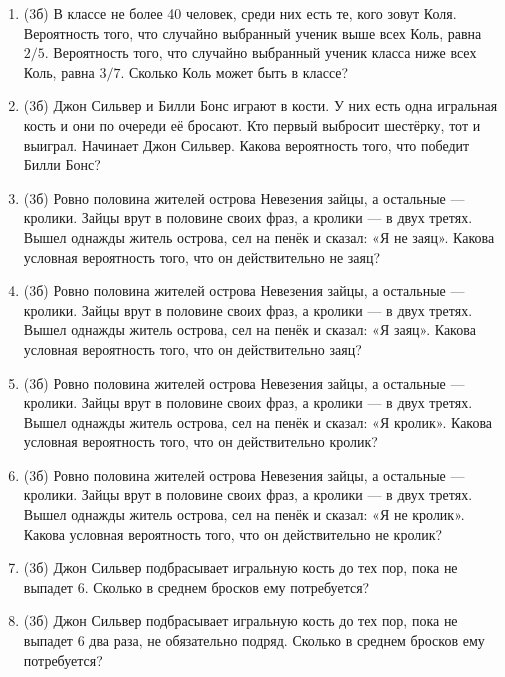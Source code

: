 \documentclass[a4paper, 12pt]{article}
\begin{document}
\newpage
\begin{enumerate}
\item (3б) В классе не более 40 человек, среди них есть те, кого зовут Коля. Вероятность того, что случайно выбранный ученик выше всех Коль, равна $2/5$. Вероятность того, что случайно выбранный ученик класса ниже всех Коль, равна $3/7$. Сколько Коль может быть в классе?
\item (3б) Джон Сильвер и Билли Бонс играют в кости. У них есть одна игральная кость и они по очереди её бросают. Кто первый выбросит шестёрку, тот и выиграл. Начинает Джон Сильвер. Какова вероятность того, что победит Билли Бонс?
\item (3б) Ровно половина жителей острова Невезения зайцы, а остальные — кролики. Зайцы врут в половине своих фраз, а кролики — в двух третях. Вышел однажды житель острова, сел на пенёк и сказал: «Я не заяц». Какова условная вероятность того, что он действительно не заяц?
\item (3б) Ровно половина жителей острова Невезения зайцы, а остальные — кролики. Зайцы врут в половине своих фраз, а кролики — в двух третях. Вышел однажды житель острова, сел на пенёк и сказал: «Я заяц». Какова условная вероятность того, что он действительно заяц?
\item (3б) Ровно половина жителей острова Невезения зайцы, а остальные — кролики. Зайцы врут в половине своих фраз, а кролики — в двух третях. Вышел однажды житель острова, сел на пенёк и сказал: «Я кролик». Какова условная вероятность того, что он действительно кролик?
\item (3б) Ровно половина жителей острова Невезения зайцы, а остальные — кролики. Зайцы врут в половине своих фраз, а кролики — в двух третях. Вышел однажды житель острова, сел на пенёк и сказал: «Я не кролик». Какова условная вероятность того, что он действительно не кролик?
\item (3б) Джон Сильвер подбрасывает игральную кость до тех пор, пока не выпадет 6. Сколько в среднем бросков ему потребуется?
\item (3б) Джон Сильвер подбрасывает игральную кость до тех пор, пока не выпадет 6 два раза, не обязательно подряд. Сколько в среднем бросков ему потребуется?

\end{enumerate}
\end{document}
